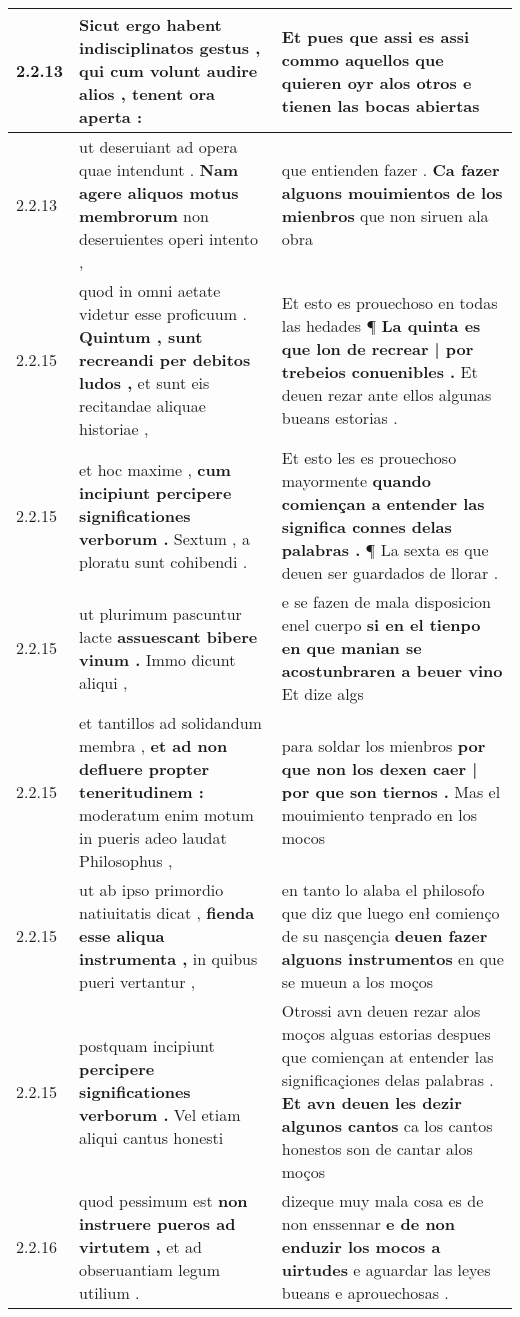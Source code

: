 \begin{tabular}{|p{1cm}|p{6.5cm}|p{6.5cm}|}
2.2.13 & Sicut ergo habent indisciplinatos gestus , \textbf{ qui cum volunt audire alios , } tenent ora aperta : & Et pues que assi es assi commo aquellos \textbf{ que quieren oyr alos otros } e tienen las bocas abiertas \\\hline
2.2.13 & ut deseruiant ad opera quae intendunt . \textbf{ Nam agere aliquos motus membrorum } non deseruientes operi intento , & que entienden fazer . \textbf{ Ca fazer alguons mouimientos de los mienbros } que non siruen ala obra \\\hline
2.2.15 & quod in omni aetate videtur esse proficuum . \textbf{ Quintum , sunt recreandi per debitos ludos , } et sunt eis recitandae aliquae historiae , & Et esto es prouechoso en todas las hedades ¶ \textbf{ La quinta es que lon de recrear | por trebeios conuenibles . } Et deuen rezar ante ellos algunas bueans estorias . \\\hline
2.2.15 & et hoc maxime , \textbf{ cum incipiunt percipere significationes verborum . } Sextum , a ploratu sunt cohibendi . & Et esto les es prouechoso mayormente \textbf{ quando comiençan a entender las significa connes delas palabras . } ¶ La sexta es que deuen ser guardados de llorar . \\\hline
2.2.15 & ut plurimum pascuntur lacte \textbf{ assuescant bibere vinum . } Immo dicunt aliqui , & e se fazen de mala disposicion enel cuerpo \textbf{ si en el tienpo en que manian se acostunbraren a beuer vino } Et dize algs \\\hline
2.2.15 & et tantillos ad solidandum membra , \textbf{ et ad non defluere propter teneritudinem : } moderatum enim motum in pueris adeo laudat Philosophus , & para soldar los mienbros \textbf{ por que non los dexen caer | por que son tiernos . } Mas el mouimiento tenprado en los mocos \\\hline
2.2.15 & ut ab ipso primordio natiuitatis dicat , \textbf{ fienda esse aliqua instrumenta , } in quibus pueri vertantur , & en tanto lo alaba el philosofo que diz que luego enł comienço de su nasçençia \textbf{ deuen fazer alguons instrumentos } en que se mueun a los moços \\\hline
2.2.15 & postquam incipiunt \textbf{ percipere significationes verborum . } Vel etiam aliqui cantus honesti & Otrossi avn deuen rezar alos moços alguas estorias despues que comiençan at entender las significaçiones delas palabras . \textbf{ Et avn deuen les dezir algunos cantos } ca los cantos honestos son de cantar alos moços \\\hline
2.2.16 & quod pessimum est \textbf{ non instruere pueros ad virtutem , } et ad obseruantiam legum utilium . & dizeque muy mala cosa es de non enssennar \textbf{ e de non enduzir los mocos a uirtudes } e aguardar las leyes bueans e aprouechosas . \\\hline

\end{tabular}
